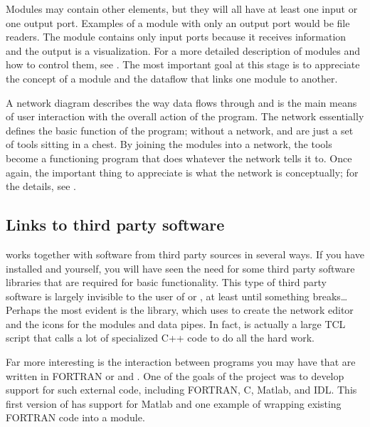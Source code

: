 Modules may contain other elements, but they will all have at least one
input or one output port.  Examples of a module with only an output port
would be file readers.  The 
module contains only input ports because it receives information and the
output is a visualization.  For a more detailed description of modules and
how to control them, see .
The most important goal at this stage is to appreciate the concept of a
module and the dataflow that links one module to another.

A network diagram  describes the way data flows
through \SR{} and is the main means of user interaction with the overall
action of the program.  The network essentially defines the basic function of
the program; without a network, \SR{} and \PSE{} are just a set of tools
sitting in a chest.  By joining the modules into a network, the tools
become a functioning program that does whatever the network tells it to.
Once again, the important thing to appreciate is what the network is
conceptually; for the details, see . 


\subsection{Links to third party software}
\label{sec:con-links} 

\SR{} works together with software from third party sources in several
ways.  If you have installed \SR{} and \PSE{} yourself, you will have seen
the need for some third party software libraries that are required for
basic functionality.  This type of third party software is largely
invisible to the user of \SR{} or \PSE{}, at least until something
breaks\ldots{} Perhaps the most evident is the
  library,
which \SR{} uses to create the network editor and the icons for the modules
and data pipes.  In fact, \SR{} is actually a large TCL script that calls a
lot of specialized C++ code to do all the hard work.


Far more interesting is the interaction between programs you may have that
are written in FORTRAN  or
 and
\SR{}.  One of the goals of the \PSE{} project was to develop support for
such external code, including FORTRAN, C, Matlab, and IDL\@.  This first
version of \PSE{} has support for Matlab and one example of wrapping
existing FORTRAN code into a \SR{} module. 

